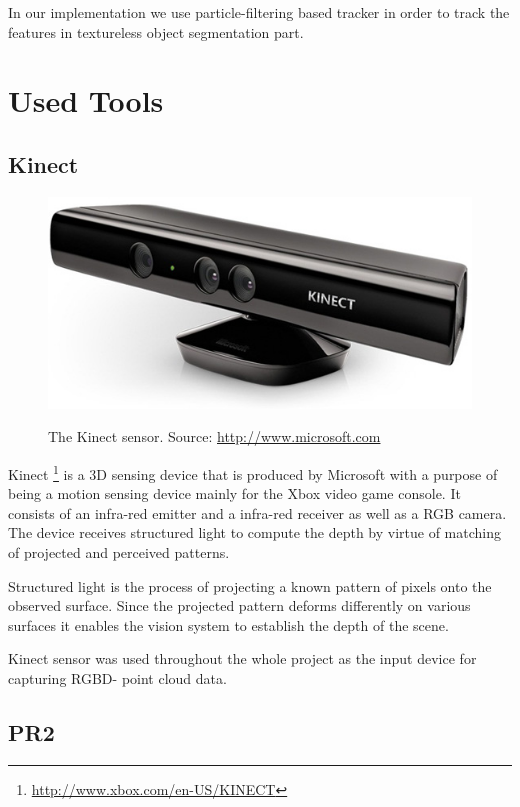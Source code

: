 In our implementation we use particle-filtering based tracker in order to track the features in textureless object segmentation part.      



\section{Used Tools}
\subsection{Kinect}

\begin{figure}
\centering

{\includegraphics[width=0.5\columnwidth]{figures/kinect.jpg}}

\caption{The Kinect sensor. Source: \url{http://www.microsoft.com}}
\label{fig:kinect}
\end{figure}

Kinect \footnote{\url{http://www.xbox.com/en-US/KINECT}} is a 3D sensing device that is produced by Microsoft with a purpose of being a motion sensing device mainly for the Xbox video game console. It consists of an infra-red emitter and a infra-red receiver as well as a RGB camera. The device receives structured light to compute the depth by virtue of matching of projected and perceived patterns.

Structured light is the process of projecting a known pattern of pixels onto the observed surface. Since the projected pattern deforms differently on various surfaces it enables  the vision system to establish the depth of the scene.

Kinect sensor was used throughout the whole project as the input device for capturing RGBD- point cloud  data.

\subsection{PR2}

